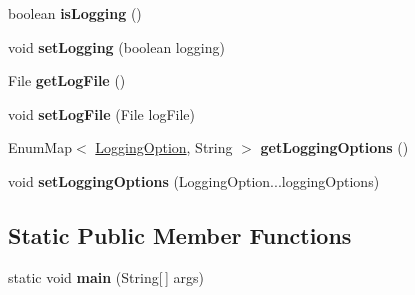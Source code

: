 \begin{DoxyCompactItemize}
\item 
\hypertarget{classdevicedetector_1_1msiexecInterface_ae2e377d5d86f2f9f8c4f469f77083773}{boolean {\bfseries is\-Logging} ()}\label{classdevicedetector_1_1msiexecInterface_ae2e377d5d86f2f9f8c4f469f77083773}

\item 
\hypertarget{classdevicedetector_1_1msiexecInterface_ae440fe69f727c62f65f1c196ed401893}{void {\bfseries set\-Logging} (boolean logging)}\label{classdevicedetector_1_1msiexecInterface_ae440fe69f727c62f65f1c196ed401893}

\item 
\hypertarget{classdevicedetector_1_1msiexecInterface_a8b0d8f54ad5aff52e4a0801d9bf17894}{File {\bfseries get\-Log\-File} ()}\label{classdevicedetector_1_1msiexecInterface_a8b0d8f54ad5aff52e4a0801d9bf17894}

\item 
\hypertarget{classdevicedetector_1_1msiexecInterface_a547e4241f3b3b88415fcf21d9ebd1dd2}{void {\bfseries set\-Log\-File} (File log\-File)}\label{classdevicedetector_1_1msiexecInterface_a547e4241f3b3b88415fcf21d9ebd1dd2}

\item 
\hypertarget{classdevicedetector_1_1msiexecInterface_a72063d1db13e102033b5e8edfa931145}{Enum\-Map$<$ \hyperlink{enumdevicedetector_1_1msiexecInterface_1_1LoggingOption}{Logging\-Option}, String $>$ {\bfseries get\-Logging\-Options} ()}\label{classdevicedetector_1_1msiexecInterface_a72063d1db13e102033b5e8edfa931145}

\item 
\hypertarget{classdevicedetector_1_1msiexecInterface_a79c9dae90ed7451077cdceb03c1a5cac}{void {\bfseries set\-Logging\-Options} (Logging\-Option...\-logging\-Options)}\label{classdevicedetector_1_1msiexecInterface_a79c9dae90ed7451077cdceb03c1a5cac}

\end{DoxyCompactItemize}
\subsection*{Static Public Member Functions}
\begin{DoxyCompactItemize}
\item 
\hypertarget{classdevicedetector_1_1msiexecInterface_a0700312a7d2281b1cddfbf2f3d9f57f2}{static void {\bfseries main} (String\mbox{[}$\,$\mbox{]} args)}\label{classdevicedetector_1_1msiexecInterface_a0700312a7d2281b1cddfbf2f3d9f57f2}

\end{DoxyCompactItemize}
